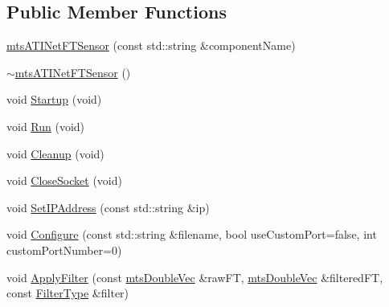 \subsection*{Public Member Functions}
\begin{DoxyCompactItemize}
\item 
\hyperlink{classmts_a_t_i_net_f_t_sensor_adf30efbe6a448cb9ca74dc734312f4b1}{mts\-A\-T\-I\-Net\-F\-T\-Sensor} (const std\-::string \&component\-Name)
\item 
\hyperlink{classmts_a_t_i_net_f_t_sensor_a10444ec7ab68c31dcbf0119756900920}{$\sim$mts\-A\-T\-I\-Net\-F\-T\-Sensor} ()
\item 
void \hyperlink{classmts_a_t_i_net_f_t_sensor_a0c0eb0990258a415063f5630c057489e}{Startup} (void)
\item 
void \hyperlink{classmts_a_t_i_net_f_t_sensor_a91e4aba10538d0e42c27748a8730cc20}{Run} (void)
\item 
void \hyperlink{classmts_a_t_i_net_f_t_sensor_a85035cf7e54de1a0924dad9ee70e3c73}{Cleanup} (void)
\item 
void \hyperlink{classmts_a_t_i_net_f_t_sensor_a51667a1895aa9427d4ac2b2204aac5ec}{Close\-Socket} (void)
\item 
void \hyperlink{classmts_a_t_i_net_f_t_sensor_a9b4e699e0de10d44d910ea5ae33cb346}{Set\-I\-P\-Address} (const std\-::string \&ip)
\item 
void \hyperlink{classmts_a_t_i_net_f_t_sensor_a056ae87346fde0a2d4871787fb78ed98}{Configure} (const std\-::string \&filename, bool use\-Custom\-Port=false, int custom\-Port\-Number=0)
\item 
void \hyperlink{classmts_a_t_i_net_f_t_sensor_a5b63083511d398a195992b3b1fae8893}{Apply\-Filter} (const \hyperlink{mts_vector_8h_af69167a5dc2ad33eb93965b9387d8403}{mts\-Double\-Vec} \&raw\-F\-T, \hyperlink{mts_vector_8h_af69167a5dc2ad33eb93965b9387d8403}{mts\-Double\-Vec} \&filtered\-F\-T, const \hyperlink{classmts_a_t_i_net_f_t_sensor_ac0b6761b0eee98b4413c5a153865c2ea}{Filter\-Type} \&filter)
\end{DoxyCompactItemize}
